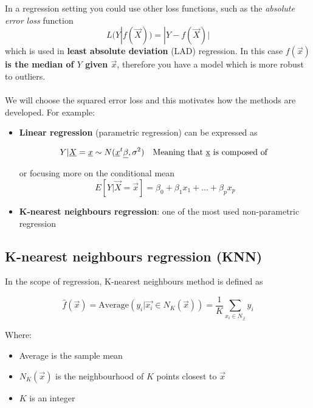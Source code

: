     In a regression setting you could use other loss functions, such as the
    \textit{absolute error loss} function
    $$L(Y|f(\vec{X})) = |Y - f(\vec{X})|$$ which is used in \textbf{least
    absolute deviation} (LAD) regression. In this case \textbf{$f(\vec{x})$ is the
    median of $Y$ given $\vec{x}$}, therefore you have a model which is more
    robust to outliers.
\\\\
    We will choose the squared error loss and this motivates how the methods are
    developed. For example:
    \begin{itemize}
      \item \textbf{Linear regression} (parametric regression) can be expressed
      as 

      \begin{align*}
        Y|\vec{X} = \vec{x} \sim N(\vec{x}^t\vec{\beta}, \sigma^2) && \text{Meaning that \vec{x} is composed of }%
      \end{align*}

      or focusing more on the conditional mean
      $$E[Y|\vec{X} = \vec{x}] = \beta_0 + \beta_1x_1 + \dots +
            \beta_px_p$$
      \item \textbf{K-nearest neighbours regression}: one of the most used
      non-parametric regression
    \end{itemize}

    \subsection{K-nearest neighbours regression (KNN)}
    
      In the scope of regression, K-nearest neighbours method is defined as

      \begin{equation}
        \hat{f}(\vec{x}) = \text{Average}(y_i | \vec{x_i} \in N_K(\vec{x})) = \frac{1}{K} \sum_{x_i \in N_{\vec{x}}}{y_i}
      \end{equation}

      Where:
      \begin{itemize}
        \item Average is the sample mean
        \item $N_K(\vec{x})$ is the neighbourhood of $K$ points closest to
        $\vec{x}$
        \item $K$ is an integer
      \end{itemize}

